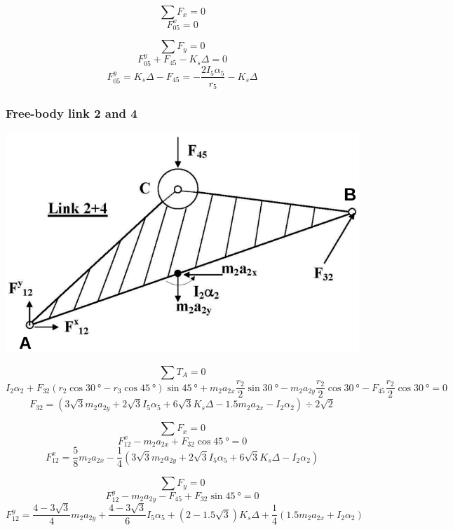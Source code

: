 \documentclass[11pt]{article}
\begin{document}
\[\sum F_x = 0\]
\[F_{05}^x = 0\]

\[\sum F_y = 0\]
\[F_{05}^y + F_{45} - K_s \Delta = 0\]
\[F_{05}^y = K_s \Delta - F_{45} = - \frac{2 I_5 \alpha_5}{r_5} - K_s \Delta\]
\subsubsection{Free-body link 2 and 4}
\label{sec:orga1dc8ee}
\begin{center}
\includegraphics[width=.9\linewidth]{./images/dynamic-force-analysis-example-3-link-2-and-4-free-body-diagram.png}
\end{center}

\[\sum T_A = 0\]
\[I_2 \alpha_2 + F_{32} (r_2 \cos \qty{30}{\degree} - r_3 \cos \qty{45}{\degree}) \sin \qty{45}{\degree} + m_2 a_{2x} \frac{r_2}{2} \sin \qty{30}{\degree} - m_2 a_{2y} \frac{r_2}{2} \cos \qty{30}{\degree} - F_{45} \frac{r_2}{2} \cos \qty{30}{\degree} = 0\]
\[F_{32} = (3 \sqrt{3} m_2 a_{2y} + 2 \sqrt{3} I_5 \alpha_5 + 6 \sqrt{3} K_s \Delta - 1.5 m_2 a_{2x} - I_2 \alpha_2) \div 2 \sqrt{2}\]

\[\sum F_x = 0\]
\[F_{12}^x - m_2 a_{2x} + F_{32} \cos \qty{45}{\degree} = 0\]
\[F_{12}^x = \frac{5}{8} m_2 a_{2x} - \frac{1}{4} (3 \sqrt{3} m_2 a_{2y} + 2 \sqrt{3} I_5 \alpha_5 + 6 \sqrt{3} K_s \Delta - I_2 \alpha_2)\]

\[\sum F_y = 0\]
\[F_{12}^y - m_2 a_{2y} - F_{45} + F_{32} \sin \qty{45}{\degree} = 0\]
\[F_{12}^y = \frac{4 - 3 \sqrt{3}}{4} m_2 a_{2y} + \frac{4 - 3 \sqrt{3}}{6} I_5 \alpha_5 + (2 - 1.5 \sqrt{3}) K_s \Delta + \frac{1}{4} (1.5 m_2 a_{2x} + I_2 \alpha_2)\]
\end{document}
